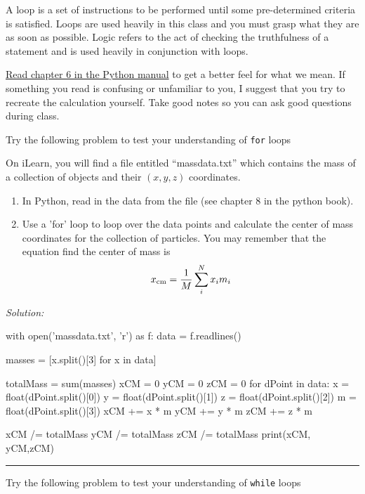  A loop is a set of instructions to be
performed until some pre-determined criteria is satisfied.  Loops are
used heavily in this class and you must grasp what they are as soon as
possible.  Logic refers to the act of checking the truthfulness of a
statement and is used heavily in conjunction with loops.

\ul{Read chapter 6 in the Python manual} to get a
better feel for what we mean. If something you read is confusing
  or unfamiliar to you, I suggest that you try to recreate the
  calculation yourself.  Take good notes so you can ask good questions
  during class.

Try the following problem to test your understanding of \texttt{for} loops
\begin{enumerate}
\probtwo On iLearn, you will find a file entitled ``massdata.txt''
which contains the mass of a collection of objects and their $(x,y,z)$
coordinates.
\begin{enumerate}
\item In Python, read in the data from the file (see chapter 8 in the python book).
\item Use a 'for' loop to loop over the data points and calculate the
  center of mass coordinates for the collection of particles.  You may
  remember that the equation find the center of mass is
\[x_\mathrm{cm} = {1\over M}\sum_i^N x_i m_i\]
\end{enumerate} 
\ifsolutions
\textit{Solution:}\\
\begin{codeexample}
\begin{VerbatimOut}{\listingFile}
with open('massdata.txt', 'r') as f:
    data = f.readlines()

masses = [x.split()[3] for x in data]

totalMass = sum(masses)
xCM = 0
yCM = 0
zCM = 0
for dPoint in data:
    x = float(dPoint.split()[0])
    y = float(dPoint.split()[1])
    z = float(dPoint.split()[2])
    m = float(dPoint.split()[3])
    xCM += x * m
    yCM += y * m
    zCM += z * m

xCM /= totalMass
yCM /= totalMass
zCM /= totalMass
print(xCM, yCM,zCM)
\end{VerbatimOut}
\end{codeexample}
\else
\noindent\rule{5 in}{0.01 in}
\fi
\end{enumerate}
Try the following problem to test your understanding of \texttt{while}
loops
